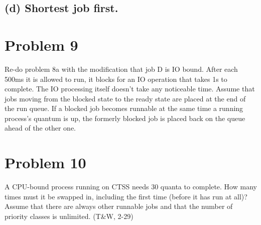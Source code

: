 \documentclass[11pt]{article}
\begin{document}
\subsection*{(d) Shortest job first.}


\section*{Problem 9}
Re-do problem 8a with the modification that job D is IO bound. After each 500ms it is allowed to run, it blocks for an IO operation that takes 1s to complete. The IO processing itself doesn’t take any noticeable time. Assume that jobs moving from the blocked state to the ready state are placed at the end of the run queue. If a blocked job becomes runnable at the same time a running process’s quantum is up, the formerly blocked job is placed back on the queue ahead of the other one.



\section*{Problem 10}
A CPU-bound process running on CTSS needs 30 quanta to complete. How many times must it be swapped in, including the first time (before it has run at all)? Assume that there are always other runnable jobs and that the number of priority classes is unlimited. (T\&W, 2-29)
\end{document}
